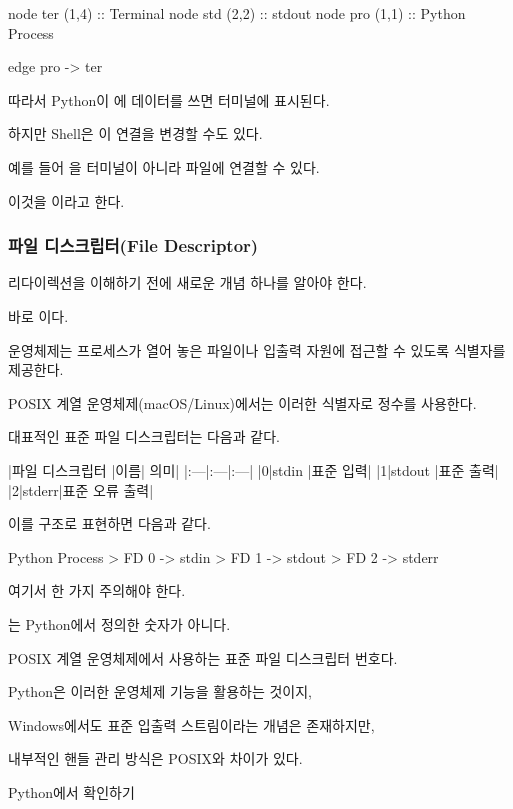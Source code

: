 \begin{dhkdiagram}
node ter (1,4) :: Terminal
node std (2,2) :: stdout
node pro (1,1) :: Python Process

edge pro -> ter
\end{dhkdiagram}

따라서 Python이 에 데이터를 쓰면 터미널에 표시된다.

하지만 Shell은 이 연결을 변경할 수도 있다.

예를 들어 을 터미널이 아니라 파일에 연결할 수 있다.

이것을 이라고 한다.

\subsubsection{파일 디스크립터(File Descriptor)}

리다이렉션을 이해하기 전에 새로운 개념 하나를 알아야 한다.

바로 이다.

운영체제는 프로세스가 열어 놓은 파일이나 입출력 자원에 접근할 수 있도록 식별자를 제공한다.

POSIX 계열 운영체제(macOS/Linux)에서는 이러한 식별자로 정수를 사용한다.

대표적인 표준 파일 디스크립터는 다음과 같다.
\begin{dhktable}
|파일 디스크립터	|이름|	의미|
|:---|:---|:---|
|0|stdin	|표준 입력|
|1|stdout	|표준 출력|
|2|stderr|표준 오류 출력|
\end{dhktable}

이를 구조로 표현하면 다음과 같다.

\begin{dhkdir}
Python Process
> FD 0 -> stdin
> FD 1 -> stdout
> FD 2 -> stderr
\end{dhkdir}

여기서 한 가지 주의해야 한다.

는 Python에서 정의한 숫자가 아니다.

POSIX 계열 운영체제에서 사용하는 표준 파일 디스크립터 번호다.

Python은 이러한 운영체제 기능을 활용하는 것이지,

Windows에서도 표준 입출력 스트림이라는 개념은 존재하지만,

내부적인 핸들 관리 방식은 POSIX와 차이가 있다.

\begin{dhknote}
\begin{dhksmry}[centered]
Python에서 확인하기
\end{dhksmry}
\end{dhknote}

